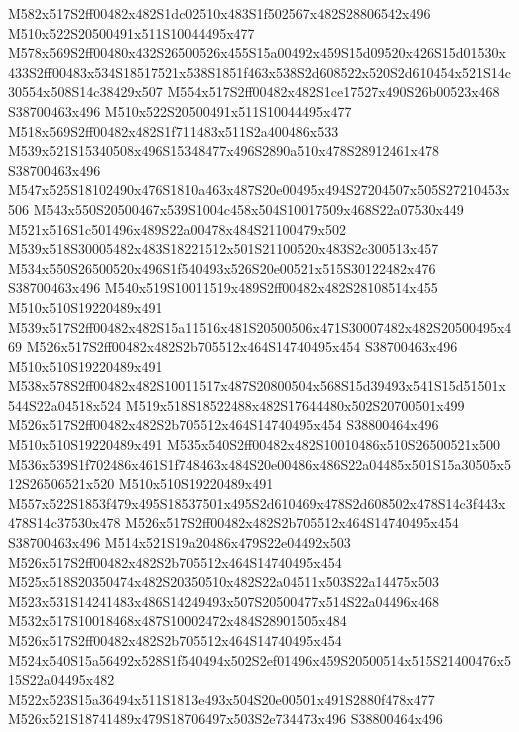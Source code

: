 \documentclass{article}
\begin{document}
\begin{multicols}{2}
M582x517S2ff00482x482S1dc02510x483S1f502567x482S28806542x496 M510x522S20500491x511S10044495x477 M578x569S2ff00480x432S26500526x455S15a00492x459S15d09520x426S15d01530x433S2ff00483x534S18517521x538S1851f463x538S2d608522x520S2d610454x521S14c30554x508S14c38429x507 M554x517S2ff00482x482S1ce17527x490S26b00523x468 S38700463x496 M510x522S20500491x511S10044495x477 M518x569S2ff00482x482S1f711483x511S2a400486x533 M539x521S15340508x496S15348477x496S2890a510x478S28912461x478 S38700463x496 M547x525S18102490x476S1810a463x487S20e00495x494S27204507x505S27210453x506 M543x550S20500467x539S1004c458x504S10017509x468S22a07530x449 M521x516S1c501496x489S22a00478x484S21100479x502 M539x518S30005482x483S18221512x501S21100520x483S2c300513x457 M534x550S26500520x496S1f540493x526S20e00521x515S30122482x476 S38700463x496 M540x519S10011519x489S2ff00482x482S28108514x455 M510x510S19220489x491 M539x517S2ff00482x482S15a11516x481S20500506x471S30007482x482S20500495x469 M526x517S2ff00482x482S2b705512x464S14740495x454 S38700463x496 M510x510S19220489x491 M538x578S2ff00482x482S10011517x487S20800504x568S15d39493x541S15d51501x544S22a04518x524 M519x518S18522488x482S17644480x502S20700501x499 M526x517S2ff00482x482S2b705512x464S14740495x454 S38800464x496 M510x510S19220489x491 M535x540S2ff00482x482S10010486x510S26500521x500 M536x539S1f702486x461S1f748463x484S20e00486x486S22a04485x501S15a30505x512S26506521x520 M510x510S19220489x491 M557x522S1853f479x495S18537501x495S2d610469x478S2d608502x478S14c3f443x478S14c37530x478 M526x517S2ff00482x482S2b705512x464S14740495x454 S38700463x496 M514x521S19a20486x479S22e04492x503 M526x517S2ff00482x482S2b705512x464S14740495x454 M525x518S20350474x482S20350510x482S22a04511x503S22a14475x503 M523x531S14241483x486S14249493x507S20500477x514S22a04496x468 M532x517S10018468x487S10002472x484S28901505x484 M526x517S2ff00482x482S2b705512x464S14740495x454 M524x540S15a56492x528S1f540494x502S2ef01496x459S20500514x515S21400476x515S22a04495x482 M522x523S15a36494x511S1813e493x504S20e00501x491S2880f478x477 M526x521S18741489x479S18706497x503S2e734473x496 S38800464x496




\end{multicols}
\end{document}
